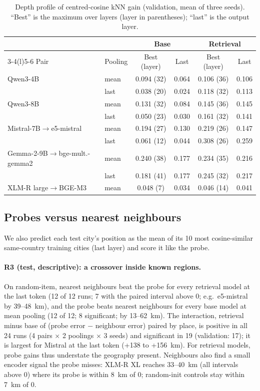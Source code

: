 \begin{table}[t]
\centering
\footnotesize
\caption{Depth profile of centred-cosine kNN gain (validation, mean of three seeds). ``Best'' is the maximum over layers (layer in parentheses); ``last'' is the output layer.}
\label{tab:depth}
\begin{tabular}{@{}llcccc@{}}
\toprule
& & \multicolumn{2}{c}{Base} & \multicolumn{2}{c}{Retrieval} \\
\cmidrule(lr){3-4}\cmidrule(l){5-6}
Pair & Pooling & Best (layer) & Last & Best (layer) & Last \\
\midrule
Qwen3-4B & mean & 0.094 (32) & 0.064 & 0.106 (36) & 0.106 \\
         & last & 0.038 (20) & 0.024 & 0.118 (32) & 0.113 \\
Qwen3-8B & mean & 0.131 (32) & 0.084 & 0.145 (36) & 0.145 \\
         & last & 0.050 (23) & 0.030 & 0.161 (32) & 0.141 \\
Mistral-7B$\to$e5-mistral & mean & 0.194 (27) & 0.130 & 0.219 (26) & 0.147 \\
         & last & 0.061 (12) & 0.044 & 0.308 (26) & 0.259 \\
Gemma-2-9B$\to$bge-mult.-gemma2 & mean & 0.240 (38) & 0.177 & 0.234 (35) & 0.216 \\
         & last & 0.181 (41) & 0.177 & 0.245 (32) & 0.217 \\
XLM-R large$\to$BGE-M3 & mean & 0.048 (7) & 0.034 & 0.046 (14) & 0.041 \\
\bottomrule
\end{tabular}
\end{table}

\subsection{Probes versus nearest neighbours}
\label{sec:res-crossover}

We also predict each test city's position as the mean of its 10 most cosine-similar same-country training cities (last layer) and score it like the probe.

\paragraph{R3 (test, descriptive): a crossover inside known regions.}
On random-item, nearest neighbours beat the probe for every retrieval model at the last token (12 of 12 runs; 7 with the paired interval above 0; e.g.\ e5-mistral by 39--48~km), and the probe beats nearest neighbours for every base model at mean pooling (12 of 12; 8 significant; by 13--62~km). The interaction, retrieval minus base of (probe error $-$ neighbour error) paired by place, is positive in all 24 runs (4 pairs $\times$ 2 poolings $\times$ 3 seeds) and significant in 19 (validation: 17); it is largest for Mistral at the last token (+138 to +156~km). For retrieval models, probe gains thus understate the geography present. Neighbours also find a small encoder signal the probe misses: XLM-R XL reaches 33--40~km (all intervals above 0) where its probe is within 8~km of 0; random-init controls stay within 7~km of 0.

